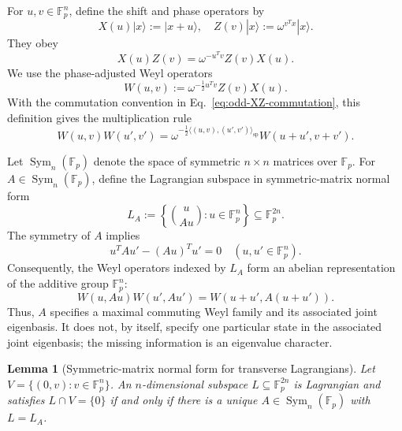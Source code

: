 \documentclass[11pt]{article}
\newcommand{\F}{\mathbb F}
\newcommand{\Sym}{\operatorname{Sym}}
\newcommand{\1}{\mathbf 1}
\newcommand{\spair}[2]{\langle #1,#2\rangle_{\mathrm{sp}}}
\theoremstyle{plain}
\newtheorem{lemma}[theorem]{Lemma}
\theoremstyle{definition}
\theoremstyle{remark}
\begin{document}
For $u,v\in\F_p^n$, define the shift and phase operators by
\begin{equation}
  X(u)|x\rangle:=|x+u\rangle,
  \quad
  Z(v)|x\rangle:=\omega^{v^Tx}|x\rangle.
  \label{eq:odd-XZ-definitions}
\end{equation}
They obey
\begin{equation}
  X(u)Z(v)=\omega^{-u^Tv}Z(v)X(u).
  \label{eq:odd-XZ-commutation}
\end{equation}
We use the phase-adjusted Weyl operators
\begin{equation}
  W(u,v):=\omega^{-\frac12u^Tv}Z(v)X(u).
  \label{eq:odd-Weyl-definition}
\end{equation}
With the commutation convention in Eq.~\eqref{eq:odd-XZ-commutation}, this definition gives the multiplication rule
\begin{equation}
  W(u,v)W(u',v')
  =\omega^{-\frac12\spair{(u,v)}{(u',v')}}
   W(u+u',v+v').
  \label{eq:odd-Weyl-multiplication}
\end{equation}

Let $\Sym_n(\F_p)$ denote the space of symmetric $n\times n$ matrices over
$\F_p$.
For $A\in\Sym_n(\F_p)$, define the Lagrangian subspace in symmetric-matrix normal form
\begin{equation}
  L_A:=\left\{\binom{u}{Au}:u\in\F_p^n\right\}
  \subseteq\F_p^{2n}.
  \label{eq:symmetric-matrix-normal-form-LA}
\end{equation}
The symmetry of $A$ implies
\begin{equation}
  u^TAu'-(Au)^Tu'=0
  \quad
  (u,u'\in\F_p^n).
  \label{eq:symmetric-matrix-normal-form-isotropy}
\end{equation}
Consequently, the Weyl operators indexed by $L_A$ form an abelian
representation of the additive group $\F_p^n$:
\begin{equation}
  W(u,Au)W(u',Au')=W(u+u',A(u+u')).
  \label{eq:symmetric-matrix-Weyl-group}
\end{equation}
Thus, $A$ specifies a maximal commuting Weyl family and its associated joint eigenbasis.  It does not, by itself, specify one particular state in
the associated joint eigenbasis; the missing information is an eigenvalue
character.

\begin{lemma}[Symmetric-matrix normal form for transverse Lagrangians]
\label{lem:transverse-symmetric-matrix-normal-form}
Let $V=\{(0,v):v\in\F_p^n\}$. An $n$-dimensional subspace
$L\subseteq\F_p^{2n}$ is Lagrangian and satisfies $L\cap V=\{0\}$ if and only if
there is a unique $A\in\Sym_n(\F_p)$ with $L=L_A$.
\end{lemma}
\end{document}
